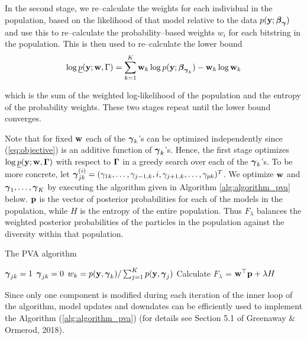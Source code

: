 In the second stage, we re--calculate the weights for each individual in the population, based on the
likelihood of that model relative to the data $p({\bf y}; {\boldsymbol \beta}_{\boldsymbol \gamma})$ and use this to re--calculate the
probability--based weights $w_i$ for each bitstring in the population. This is then used to re--calculate the
lower bound
\[
	\log \underline{p}({\bf y}; {\bf w}, \Gamma) = \sum_{k=1}^K {\bf w}_k \log p({\bf y}; {\boldsymbol \beta}_{{\boldsymbol \gamma}_k}) - {\bf w}_k \log {\bf w}_k
\]

which is the sum of the weighted log-likelihood of the population and the entropy of the probability weights.
These two stages repeat until the lower bound converges.

Note that for fixed ${\bf w}$ each of the ${\boldsymbol \gamma}_k$'s can be optimized independently
since (\ref{eq:objective}) is an additive function of ${\boldsymbol \gamma}_k$'s. Hence,
the first stage optimizes $\log \underline{p}({\bf y};{\bf w},{\boldsymbol \Gamma})$ with respect
to ${\boldsymbol \Gamma}$ in a greedy search over each of the  ${\boldsymbol \gamma}_k$'s. 
To be more concrete, let
${\boldsymbol \gamma}_{jk}^{(i)} = (\gamma_{1k},\ldots,\gamma_{j-1,k},i,\gamma_{j+1,k},\ldots,\gamma_{pk})^T$.
We optimize ${\bf w}$ and ${\boldsymbol \gamma}_1,\ldots,{\boldsymbol \gamma}_K$ by executing the algorithm given in Algorithm
\ref{alg:algorithm_pva} below. ${\bf p}$ is the vector of posterior probabilities for each of the models  in the
population, while $H$ is the entropy of the entire population. Thus $F_\lambda$ balances the weighted
posterior  probabilities of the particles in the population against the diversity within that population.

\begin{algorithm}\label{alg:updateGamma}
	\caption{The PVA algorithm}
	\label{alg:algorithm_pva}
	\begin{algorithmic}
						\STATE ${\boldsymbol \gamma}_{jk} = 1$
					\ELSE
						\STATE ${\boldsymbol \gamma}_{jk} = 0$
					\ENDIF
				\ENDFOR
				\STATE $w_k = p({\bf y}, {\boldsymbol \gamma}_k) / \sum_{j=1}^K p({\bf y}, {\boldsymbol \gamma}_j)$
			\ENDFOR
			\STATE Calculate $F_\lambda$ = ${\bf w}^\top {\bf p} + \lambda H$
		\ENDWHILE
	\end{algorithmic}
\end{algorithm}

	\noindent 
	Since only one component is modified during each iteration of the inner loop of the algorithm, model updates
	and downdates can be efficiently used to implement the Algorithm (\ref{alg:algorithm_pva}) (for details see 
	Section 5.1 of Greenaway \& Ormerod, 2018).

